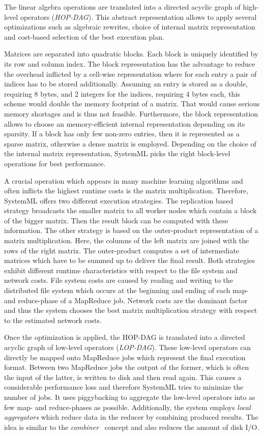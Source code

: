 The linear algebra operations are translated into a directed acyclic graph of high-level operators (\emph{HOP-DAG}).
This abstract representation allows to apply several optimizations such as algebraic rewrites, choice of internal matrix representation and cost-based selection of the best execution plan.

Matrices are separated into quadratic blocks.
Each block is uniquely identified by its row and column index.
The block representation has the advantage to reduce the overhead inflicted by a cell-wise representation where for each entry a pair of indices has to be stored additionally.
Assuming an entry is stored as a double, requiring 8 bytes, and 2 integers for the indices, requiring 4 bytes each, this scheme would double the memory footprint of a matrix.
That would cause serious memory shortages and is thus not feasible.
Furthermore, the block representation allows to choose an memory-efficient internal representation depending on its sparsity.
If a block has only few non-zero entries, then it is represented as a sparse matrix, otherwise a dense matrix is employed.
Depending on the choice of the internal matrix representation, SystemML picks the right block-level operations for best performance.

A crucial operation which appears in many machine learning algorithms and often inflicts the highest runtime costs is the matrix multiplication.
Therefore, SystemML offers two different execution strategies.
The replication based strategy broadcasts the smaller matrix to all worker nodes which contain a block of the bigger matrix.
Then the result block can be computed with these information.
The other strategy is based on the outer-product representation of a matrix multiplication.
Here, the columns of the left matrix are joined with the rows of the right matrix.
The outer-product computes a set of intermediate matrices which have to be summed up to deliver the final result.
Both strategies exhibit different runtime characteristics with respect to the file system and network costs.
File system costs are caused by reading and writing to the distributed file system which occurs at the beginning and ending of each map- and reduce-phase of a MapReduce job.
Network costs are the dominant factor and thus the system chooses the best matrix multiplication strategy with respect to the estimated network costs.

Once the optimization is applied, the HOP-DAG is translated into a directed acyclic graph of low-level operators (\emph{LOP-DAG}).
These low-level operators can directly be mapped onto MapReduce jobs which represent the final execution format.
Between two MapReduce jobs the output of the former, which is often the input of the latter, is written to disk and then read again.
This causes a considerable performance loss and therefore SystemML tries to minimize the number of jobs.
It uses piggybacking to aggregate the low-level operators into as few map- and reduce-phases as possible.
Additionally, the system employs \emph{local aggregators} which reduce data in the reducer by combining produced results.
The idea is similar to the \emph{combiner}~\cite{dean:c2008a} concept and also reduces the amount of disk I/O.

